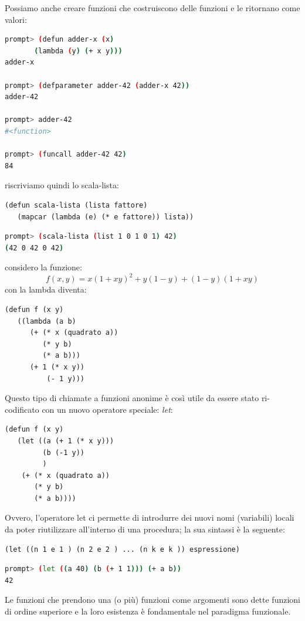 \documentclass[a4paper,12pt, oneside]{book}
\begin{document}
Possiamo anche creare funzioni che costruiscono delle funzioni e le ritornano come valori:
\begin{shaded}
\begin{lstlisting}[language=bash]
prompt> (defun adder-x (x)
       (lambda (y) (+ x y)))
adder-x

prompt> (defparameter adder-42 (adder-x 42))
adder-42

prompt> adder-42
#<function>

prompt> (funcall adder-42 42)
84
\end{lstlisting}
\end{shaded}
riscriviamo quindi lo scala-lista:
\begin{verbatim}
(defun scala-lista (lista fattore)
   (mapcar (lambda (e) (* e fattore)) lista))
\end{verbatim}
\begin{shaded}
\begin{lstlisting}[language=bash]
prompt> (scala-lista (list 1 0 1 0 1) 42)
(42 0 42 0 42)
\end{lstlisting}
\end{shaded}
considero la funzione:
$$f(x, y) = x (1 + x y)^2 + y (1 - y) + (1 - y) (1 + x y)$$
con la lambda diventa:
\begin{verbatim}
(defun f (x y)
   ((lambda (a b)
      (+ (* x (quadrato a))
         (* y b)
         (* a b)))
      (+ 1 (* x y))
          (- 1 y)))
\end{verbatim}
Questo tipo di chiamate a funzioni anonime è così utile da essere stato ri-codificato
con un nuovo operatore speciale: \textit{let}:
\begin{verbatim}
(defun f (x y)
   (let ((a (+ 1 (* x y)))
         (b (-1 y))
         )
    (+ (* x (quadrato a))
       (* y b)
       (* a b))))
\end{verbatim}
Ovvero, l'operatore let ci permette di introdurre dei nuovi nomi (variabili) locali da
poter riutilizzare all'interno di una procedura; la sua sintassi è la seguente:
\begin{verbatim}
(let ((n 1 e 1 ) (n 2 e 2 ) ... (n k e k )) espressione)
\end{verbatim}
\begin{shaded}
\begin{lstlisting}[language=bash]
prompt> (let ((a 40) (b (+ 1 1))) (+ a b))
42
\end{lstlisting}
\end{shaded}
Le funzioni che prendono una (o più) funzioni come argomenti
sono dette funzioni di ordine superiore e la loro esistenza è fondamentale nel paradigma funzionale.\\
\end{document}
